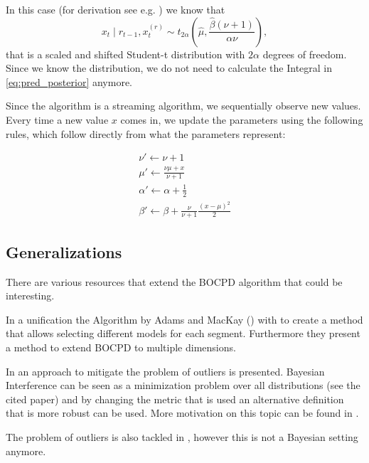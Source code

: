 \documentclass[12pt,a4paper]{article}
\begin{document}
In this case (for derivation see e.g. \cite{Murphy:ConjugateBayesiananalysis}) we know that
\begin{equation} \label{eg:xt_t_distribution}
x_t \mid r_{t-1}, x_{t}^{(r)} \sim t_{2\alpha}\left(\hat\mu, \frac{\hat\beta(\nu + 1)}{\alpha\nu}\right),
\end{equation}
that is a scaled and shifted Student-t distribution with $2\alpha$ degrees of freedom. Since we know the distribution, we do not need to calculate the Integral in \eqref{eq:pred_posterior} anymore.

Since the algorithm is a streaming algorithm, we sequentially observe new values. Every time a new value $x$ comes in, we update the parameters using the following rules, which follow directly from what the parameters represent:

\begin{equation*}
\begin{gathered}
\nu' \leftarrow \nu + 1 \\
\mu' \leftarrow \frac{\nu \mu + x}{\nu + 1} \\
\alpha' \leftarrow \alpha + \frac12 \\
\beta' \leftarrow \beta + \frac{\nu}{\nu + 1} \frac{(x - \mu)^2}{2}
\end{gathered}
\end{equation*}

\subsection{Generalizations}
There are various resources that extend the BOCPD algorithm that could be interesting. 

In \cite{Knoblauch:SpatiotemporalBayesian} a unification the Algorithm by Adams and MacKay (\cite{Adams:BayesianOnlineChangepoint}) with \cite{Fearnhead:lineinferencemultiple,Fearnhead:lineinferencemultiple} to create a method that allows selecting different models for each segment. Furthermore they present a method to extend BOCPD to multiple dimensions.

In \cite{Knoblauch:DoublyRobustBayesian} an approach to mitigate the problem of outliers is presented. Bayesian Interference can be seen as a minimization problem over all distributions (see the cited paper) and by changing the metric that is used an alternative definition that is more robust can be used. More motivation on this topic can be found in \cite{Knoblauch:GeneralizedVariationalInference}.

The problem of outliers is also tackled in \cite{Fearnhead:ChangepointDetectionPresence}, however this is not a Bayesian setting anymore.
\end{document}
